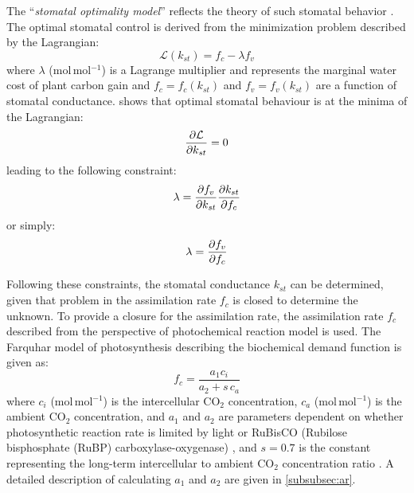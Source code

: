The ``\textit{stomatal optimality model}'' reflects the theory of such stomatal behavior \citep{Cowan1978}. The optimal stomatal control is derived from the minimization problem described by the Lagrangian:
\begin{equation} 
\mathcal{L}(k_{st}) = f_c - \lambda f_v
\end{equation}
where $\lambda$ (mol\,mol$^{-1}$) is a Lagrange multiplier and represents the marginal water cost of plant carbon gain \citep{Medlyn2011,Katul2010,Manoli2014} and $f_c = f_c(k_{st})$ and $f_v=f_v(k_{st})$ are a function of stomatal conductance. \cite{Cowan1978} shows that optimal stomatal behaviour is at the minima of the Lagrangian:
\begin{equation}
\frac{\partial \mathcal{L}}{\partial k_{st}} = 0
\label{eq:lagrangian1}
\end{equation}
leading to the following constraint:
\begin{equation}
\lambda = \frac{\partial f_v}{\partial k_{st}}\frac{\partial k_{st}}{\partial f_c} 
\end{equation}
or simply:
\begin{equation}
\lambda = \frac{\partial f_v}{\partial f_c} 
\end{equation}

Following these constraints, the stomatal conductance $k_{\textit{st}}$ can be determined, given that problem in the assimilation rate $f_c$ is closed to determine the unknown. To provide a closure for the assimilation rate, the assimilation rate $f_c$ described from the perspective of photochemical reaction model is used. The Farquhar model of photosynthesis describing the biochemical demand function is given as:
\begin{equation}
f_c = \frac{a_1 c_i}{a_2 + s\,c_a}
\label{eq:bioassim}
\end{equation}
where $c_i$ (mol\,mol$^{-1}$)  is the intercellular CO$_2$ concentration, $c_a$ (mol\,mol$^{-1}$) is the ambient CO$_2$ concentration, and $a_1$ and $a_2$ are parameters dependent on whether photosynthetic reaction rate is limited by light or RuBisCO (Rubilose bisphosphate (RuBP) carboxylase-oxygenase) \citep{Katul2010, Farquhar1980}, and $s=0.7$ is the constant representing the long-term intercellular to ambient CO$_2$ concentration ratio \citep{Volpe2013}. A detailed description of calculating $a_1$ and $a_2$ are given in \cref{subsubsec:ar}.


